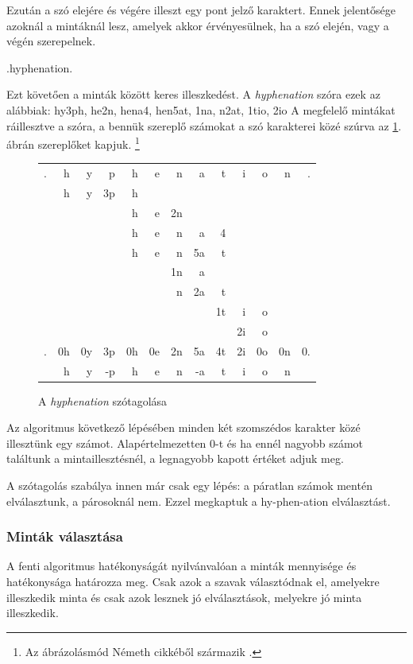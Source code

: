 \documentclass[a4paper, magyar]{article}
\begin{document}
Ezután a szó elejére és végére illeszt egy pont  jelző karaktert. Ennek jelentősége azoknál a mintáknál lesz, amelyek akkor érvényesülnek, ha a szó elején, vagy a végén szerepelnek.
{\selectfont
	\begin{center}
	.hyphenation.
	\end{center}
}
Ezt követően a minták között keres illeszkedést. A \textit{hyphenation} szóra ezek az alábbiak: 
{\selectfont hy3ph, he2n, hena4, hen5at, 1na, n2at, 1tio,  2io}  \cite[37.\ oldal]{liang1983word}
A megfelelő mintákat ráillesztve a szóra, a bennük szereplő számokat a szó karakterei közé szúrva az \ref{liang-hyp}. ábrán szereplőket kapjuk.%
\footnote{Az ábrázolásmód N{\'e}meth cikkéből származik \cite{nemeth2006automatic}.}
\begin{figure}[ht]\centering
	{\selectfont
		\setlength{\tabcolsep}{0pt}
		\begin{tabular}{rrrrrrrrrrrrr}
			.& h& y& p& h& e& n& a & t& i& o& n& .\\
			 & h& y&3p& h\\
			 &  &  &  & h& e&2n\\
			 &  &  &  & h& e& n& a&4\phantom{t}\\
			 &  &  &  & h& e& n&5a&t\\
			 &  &  &  &  &  &1n& a\\
			 &  &  &  &  &  & n&2a& t\\
			 &  &  &  &  &  &  &  &1t& i& o\\
			 &  &  &  &  &  &  &  &  &2i& o\\
			 \hline
			 .&0h&0y&3p&0h&0e&2n&5a&4t&2i&0o&0n&0.\\
			  & h& y&-p& h& e& n&-a& t& i& o& n
		\end{tabular}
	}
\caption{A \textit{hyphenation} szótagolása}\par\medskip\centering
\label{liang-hyp}
\end{figure}


Az algoritmus következő lépésében minden két szomszédos karakter közé illesztünk egy számot. Alapértelmezetten $0$-t és ha ennél nagyobb számot találtunk a mintaillesztésnél, a legnagyobb kapott értéket adjuk meg.

A szótagolás szabálya innen már csak egy lépés: a páratlan számok mentén elválasztunk, a párosoknál nem. Ezzel megkaptuk a
{\selectfont
	hy-phen-ation%
}
elválasztást.
\subsubsection{Minták választása}
A fenti algoritmus hatékonyságát nyilvánvalóan a minták mennyisége és hatékonysága határozza meg. Csak azok a szavak választódnak el, amelyekre illeszkedik minta és csak azok lesznek jó elválasztások, melyekre jó minta illeszkedik.
\end{document}
